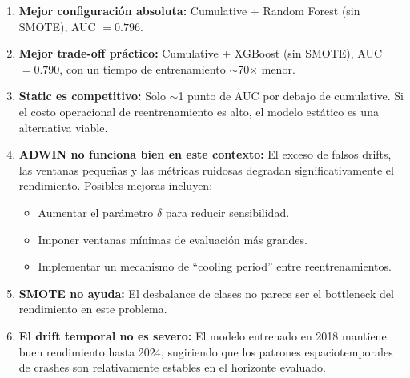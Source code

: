 \documentclass[11pt,a4paper]{article}
\begin{document}
\begin{enumerate}
    \item \textbf{Mejor configuración absoluta:} Cumulative + Random Forest (sin SMOTE), AUC $= 0.796$.

    \item \textbf{Mejor trade-off práctico:} Cumulative + XGBoost (sin SMOTE), AUC $= 0.790$, con un tiempo de entrenamiento $\sim$70$\times$ menor.

    \item \textbf{Static es competitivo:} Solo $\sim$1 punto de AUC por debajo de cumulative. Si el costo operacional de reentrenamiento es alto, el modelo estático es una alternativa viable.

    \item \textbf{ADWIN no funciona bien en este contexto:} El exceso de falsos drifts, las ventanas pequeñas y las métricas ruidosas degradan significativamente el rendimiento. Posibles mejoras incluyen:
    \begin{itemize}[nosep]
        \item Aumentar el parámetro $\delta$ para reducir sensibilidad.
        \item Imponer ventanas mínimas de evaluación más grandes.
        \item Implementar un mecanismo de ``cooling period'' entre reentrenamientos.
    \end{itemize}

    \item \textbf{SMOTE no ayuda:} El desbalance de clases no parece ser el bottleneck del rendimiento en este problema.

    \item \textbf{El drift temporal no es severo:} El modelo entrenado en 2018 mantiene buen rendimiento hasta 2024, sugiriendo que los patrones espaciotemporales de crashes son relativamente estables en el horizonte evaluado.
\end{enumerate}
\end{document}
